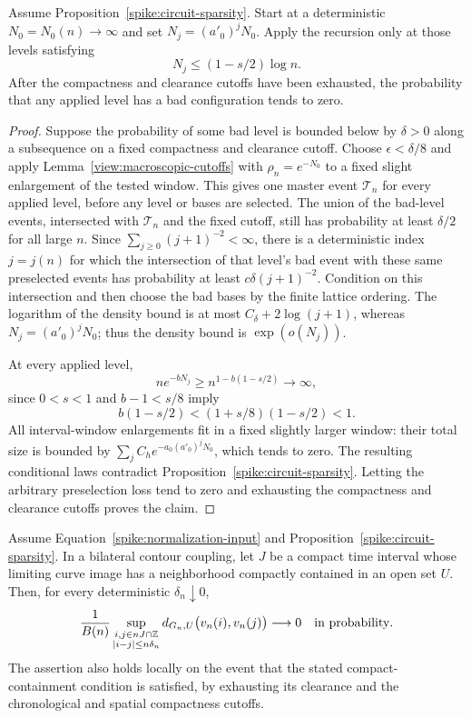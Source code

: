 \begin{lemma}\label{spike:levels}
Assume Proposition~\ref{spike:circuit-sparsity}.  Start at a deterministic
$N_0=N_0(n)\to\infty$ and set $N_j=(a'_0)^jN_0$.  Apply the recursion
only at those levels satisfying
\[
 N_j\le(1-s/2)\log n.
\]
After the compactness and clearance cutoffs have been exhausted, the
probability that any applied level has a bad configuration tends to zero.
\end{lemma}

\begin{proof}
Suppose the probability of some bad level is bounded below by
$\delta>0$ along a subsequence on a fixed compactness and clearance
cutoff.  Choose $\epsilon<\delta/8$ and apply
Lemma~\ref{view:macroscopic-cutoffs} with $\rho_n=e^{-N_0}$ to a fixed
slight enlargement of the tested window.  This gives one master event
$\mathcal T_n$ for every applied level, before any level or bases are
selected.  The union of the bad-level events, intersected with
$\mathcal T_n$ and the fixed cutoff, still has probability at least
$\delta/2$ for all large $n$.
Since $\sum_{j\ge0}(j+1)^{-2}<\infty$, there is a deterministic
index $j=j(n)$ for which the intersection of that level's bad event
with these same preselected events has probability at least
$c\delta(j+1)^{-2}$.  Condition on this intersection and then choose the
bad bases by the finite lattice ordering.  The logarithm of the
density bound is at most $C_\delta+2\log(j+1)$, whereas
$N_j=(a'_0)^jN_0$; thus the density bound is $\exp(o(N_j))$.

At every applied level,
\[
 n e^{-bN_j}\ge n^{1-b(1-s/2)}\longrightarrow\infty,
\]
since $0<s<1$ and $b-1<s/8$ imply
\[
 b(1-s/2)<(1+s/8)(1-s/2)<1.
\]
All interval-window enlargements fit in a fixed slightly larger window:
their total size is bounded by
$\sum_j C_h e^{-a_0(a'_0)^jN_0}$, which tends to zero.
The resulting conditional laws contradict
Proposition~\ref{spike:circuit-sparsity}.  Letting the arbitrary
preselection loss tend to zero and exhausting the compactness and
clearance cutoffs proves the claim.
\end{proof}

\begin{proposition}\label{spike:time-modulus}
Assume Equation~\eqref{spike:normalization-input} and
Proposition~\ref{spike:circuit-sparsity}.  In a bilateral contour coupling,
let $J$ be a compact time interval whose limiting curve image has a
neighborhood compactly contained in an open set $U$.  Then, for every
deterministic $\delta_n\downarrow0$,
\[
 \frac1{B(n)}
 \sup_{\substack{i,j\in nJ\cap\mathbb Z\\ |i-j|\le n\delta_n}}
 d_{G_n,U}\bigl(v_n(i),v_n(j)\bigr)
 \longrightarrow0
 \quad\hbox{in probability}.
\]
The assertion also holds locally on the event that the stated
compact-containment condition is satisfied, by exhausting its clearance
and the chronological and spatial compactness cutoffs.
\end{proposition}


